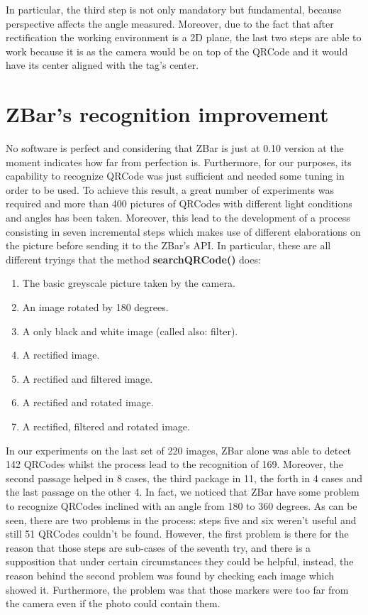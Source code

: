 In particular, the third step is not only mandatory but fundamental, because perspective affects the angle measured. Moreover, due to the fact that after rectification the working environment is a 2D plane, the last two steps are able to work because it is as the camera would be on top of the QRCode and it would have its center aligned with the tag's center.

\section{ZBar's recognition improvement} 
No software is perfect and considering that ZBar is just at 0.10 version at the moment indicates how far from perfection is. Furthermore, for our purposes, its capability to recognize QRCode was just sufficient and needed some tuning in order to be used. To achieve this result, a great number of experiments was required and more than 400 pictures of QRCodes with different light conditions and angles has been taken. Moreover, this lead to the development of a process consisting in seven incremental steps which makes use of different elaborations on the picture before sending it to the ZBar's API.
In particular, these are all different tryings that the method \textbf{searchQRCode()} does:

\begin{enumerate}
	\item The basic greyscale picture taken by the camera.
	\item An image rotated by 180 degrees.
	\item A only black and white image (called also: filter).
	\item A rectified image.
	\item A rectified and filtered image.
	\item A rectified and rotated image.
	\item A rectified, filtered and rotated image.
\end{enumerate}

In our experiments on the last set of 220 images, ZBar alone was able to detect 142 QRCodes whilst the process lead to the recognition of 169. Moreover, the second passage helped in 8 cases, the third package in 11, the forth in 4 cases and the last passage on the other 4. In fact, we noticed that ZBar have some problem to recognize QRCodes inclined with an angle from 180 to 360 degrees.
As can be seen, there are two problems in the process: steps five and six weren't useful and still 51 QRCodes couldn't be found. However, the first problem is there for the reason that those steps are sub-cases of the seventh try, and there is a supposition that under certain circumstances they could be helpful, instead, the reason behind the second problem was found by checking each image which showed it. Furthermore, the problem was that those markers were too far from the camera even if the photo could contain them.

